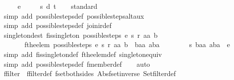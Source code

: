 \begin{isabellebody}
\ \ \ \ \ e\ {\isacharequal}\isanewline
\ \ \ \ {\isacharbraceleft}{\isacharbar}{\isacharparenleft}{\isacharparenleft}s{\isacharcomma}\ d{\isacharparenright}{\isacharcomma}\ t{\isacharparenright}{\isacharbar}{\isacharbraceright}{\isacharparenright}{\isachardoublequoteclose}\isanewline
%
\isadelimproof
\ \ %
\endisadelimproof
%
\isatagproof
{}\isamarkupfalse%
\ standard\isanewline
\ \ \ \isamarkupfalse%
\ {\isacharparenleft}simp\ add{\isacharcolon}\ possible{\isacharunderscore}steps{\isacharunderscore}def\ possible{\isacharunderscore}steps{\isacharunderscore}alt{\isacharunderscore}aux{\isacharparenright}\isanewline
\ \ \isamarkupfalse%
\ {\isacharparenleft}simp\ add{\isacharcolon}\ possible{\isacharunderscore}steps{\isacharunderscore}def\ join{\isacharunderscore}ir{\isacharunderscore}def{\isacharparenright}%
\endisatagproof
{\isafoldproof}%
%
\isadelimproof
\isanewline
%
\endisadelimproof
\isanewline
{}\isamarkupfalse%
\ singleton{\isacharunderscore}dest{\isacharcolon}\ {\isachardoublequoteopen}fis{\isacharunderscore}singleton\ {\isacharparenleft}possible{\isacharunderscore}steps\ e\ s\ r\ aa\ b{\isacharparenright}\ {\isasymLongrightarrow}\isanewline
\ \ \ \ \ \ \ fthe{\isacharunderscore}elem\ {\isacharparenleft}possible{\isacharunderscore}steps\ e\ s\ r\ aa\ b{\isacharparenright}\ {\isacharequal}\ {\isacharparenleft}baa{\isacharcomma}\ aba{\isacharparenright}\ {\isasymLongrightarrow}\isanewline
\ \ \ \ \ \ \ {\isacharparenleft}{\isacharparenleft}s{\isacharcomma}\ baa{\isacharparenright}{\isacharcomma}\ aba{\isacharparenright}\ {\isacharbar}{\isasymin}{\isacharbar}\ e{\isachardoublequoteclose}\isanewline
%
\isadelimproof
\ \ %
\endisadelimproof
%
\isatagproof
{}\isamarkupfalse%
\ {\isacharparenleft}simp\ add{\isacharcolon}\ fis{\isacharunderscore}singleton{\isacharunderscore}def\ fthe{\isacharunderscore}elem{\isacharunderscore}def\ singleton{\isacharunderscore}equiv{\isacharparenright}\isanewline
\ \ \isamarkupfalse%
\ {\isacharparenleft}simp\ add{\isacharcolon}\ possible{\isacharunderscore}steps{\isacharunderscore}def\ fmember{\isacharunderscore}def{\isacharparenright}\isanewline
\ \ \isamarkupfalse%
\ auto%
\endisatagproof
{\isafoldproof}%
%
\isadelimproof
\isanewline
%
\endisadelimproof
\isanewline
{}\isamarkupfalse%
\ ffilter\ {\isacharequal}\ ffilter{\isacharunderscore}def\ fset{\isacharunderscore}both{\isacharunderscore}sides\ Abs{\isacharunderscore}fset{\isacharunderscore}inverse\ Set{\isachardot}filter{\isacharunderscore}def\isanewline

\end{isabellebody}
